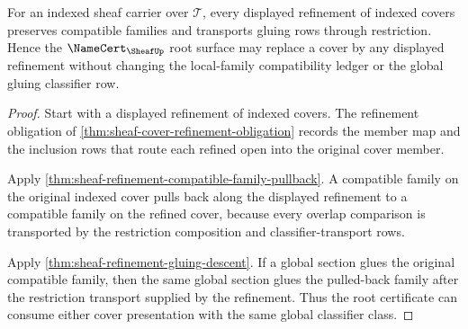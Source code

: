\begin{theorem}
\label{thm:sheaf-root-restriction-refinement-obligation}
For an indexed sheaf carrier over $\mathcal{T}$, every displayed refinement of indexed covers preserves compatible families and transports gluing rows through restriction. Hence the $\NameCert_{\SheafUp}$ root surface may replace a cover by any displayed refinement without changing the local-family compatibility ledger or the global gluing classifier row.
\end{theorem}
\begin{proof}
Start with a displayed refinement of indexed covers. The refinement obligation of \autoref{thm:sheaf-cover-refinement-obligation} records the member map and the inclusion rows that route each refined open into the original cover member.

Apply \autoref{thm:sheaf-refinement-compatible-family-pullback}. A compatible family on the original indexed cover pulls back along the displayed refinement to a compatible family on the refined cover, because every overlap comparison is transported by the restriction composition and classifier-transport rows.

Apply \autoref{thm:sheaf-refinement-gluing-descent}. If a global section glues the original compatible family, then the same global section glues the pulled-back family after the restriction transport supplied by the refinement. Thus the root certificate can consume either cover presentation with the same global classifier class.
\end{proof}


